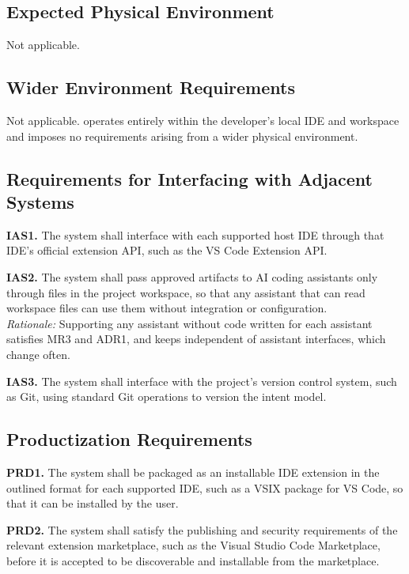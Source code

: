 \documentclass[12pt]{article}
\begin{document}
\subsection{Expected Physical Environment}

Not applicable. 

\subsection{Wider Environment Requirements}

Not applicable. \progname{} operates entirely within the developer's local IDE
and workspace and imposes no requirements arising from a wider physical environment. 

\subsection{Requirements for Interfacing with Adjacent Systems}

\medskip
\noindent\textbf{IAS1.} The system shall interface with each supported host IDE
through that IDE's official extension API, such as the VS Code Extension API. 

\medskip
\noindent\textbf{IAS2.} The system shall pass approved artifacts to AI coding
assistants only through files in the project workspace, so that any assistant
that can read workspace files can use them without integration or
configuration.\\
\textit{Rationale:} Supporting any assistant without code written for each assistant
satisfies MR3 and ADR1, and keeps \progname{} independent of assistant
interfaces, which change often. 

\medskip
\noindent\textbf{IAS3.} The system shall interface with the project's version
control system, such as Git, using standard Git operations to version the
intent model.

\subsection{Productization Requirements}

\medskip
\noindent\textbf{PRD1.} The system shall be packaged as an installable IDE
extension in the outlined format for each supported IDE, such as a VSIX package
for VS Code, so that it can be installed by the user. 

\medskip
\noindent\textbf{PRD2.} The system shall satisfy the publishing and security
requirements of the relevant extension marketplace, such as the Visual Studio
Code Marketplace, before it is accepted to be discoverable and installable from the marketplace. 
\end{document}

